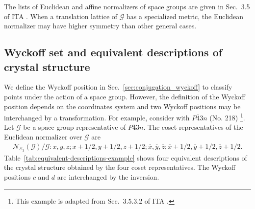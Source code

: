 The lists of Euclidean and affine normalizers of space groups are given in Sec.~3.5 of ITA \cite{ITA2016}.
When a translation lattice of $\mathcal{G}$ has a specialized metric, the Euclidean normalizer may have higher symmetry than other general cases.

\subsection{Wyckoff set and equivalent descriptions of crystal structure}

We define the Wyckoff position in Sec.~\ref{sec:conjugation_wyckoff} to classify points under the action of a space group.
However, the definition of the Wyckoff position depends on the coordinates system and two Wyckoff positions may be interchanged by a transformation.
For example, consider  with $P\overline{4}3n$ (No. 218) \footnote{
  This example is adapted from Sec.~3.5.3.2 of ITA \cite{ITA2016}.
}.
Let $\mathcal{G}$ be a space-group representative of $P\overline{4}3n$.
The coset representatives of the Euclidean normalizer over $\mathcal{G}$ are
\begin{align*}
  \mathcal{N}_{\mathcal{E}_{3}}(\mathcal{G}) / \mathcal{G}:
    x,y,z;
    x + 1/2, y + 1/2, z + 1/2;
    \overline{x}, \overline{y}, \overline{z};
    \overline{x} + 1/2, \overline{y} + 1/2, \overline{z} + 1/2.
\end{align*}
Table~\ref{tab:equivalent-descriptions-example} shows four equivalent descriptions of the crystal structure obtained by the four coset representatives.
The Wyckoff positions $c$ and $d$ are interchanged by the inversion.

